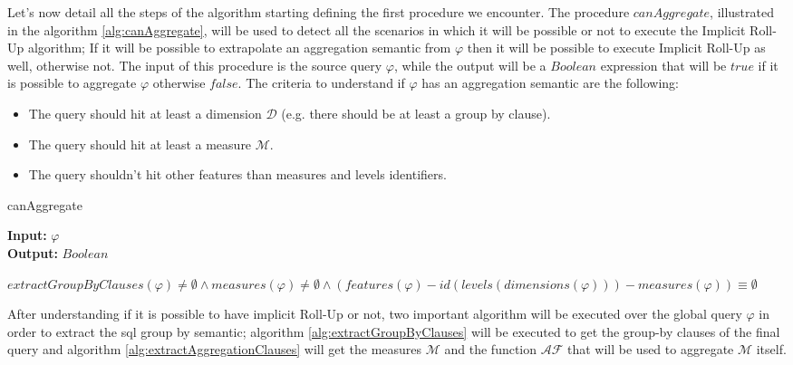 \documentclass[12pt,a4paper]{report}
\newcommand\globalQuery{\varphi}
\newcommand\dimension{\mathcal{D}}
\newcommand\measure{\mathcal{M}}
\newcommand\dimensions{dimensions}
\newcommand\aggregatingFunction{\mathcal{AF}}
\newcommand\id{id}
\newcommand\levels{levels}
\newcommand\measures{measures}
\newcommand\features{features}
\begin{document}
Let's now detail all the steps of the algorithm starting defining the first procedure we encounter.
%
The procedure $canAggregate$, illustrated in the  algorithm \ref{alg:canAggregate}, will be used to detect all the scenarios in which it will be possible or not to execute the Implicit Roll-Up algorithm; If it will be possible to extrapolate an aggregation semantic from $\globalQuery$ then it will be possible to execute Implicit Roll-Up as well, otherwise not.
%
The input of this procedure is the source query $\globalQuery$, while the output will be a $Boolean$ expression that will be $true$ if it is possible to aggregate $\globalQuery$ otherwise $false$.
%
The criteria to understand if $\globalQuery$ has an aggregation semantic are the following:
%
\begin{itemize}
    \item The query should hit at least a dimension $\dimension$ (e.g. there should be at least a group by clause).
    \item The query should hit at least a measure $\measure$.
    \item The query shouldn't hit other features than measures and levels identifiers.
\end{itemize}
%
\begin{algorithm}[ht]
\caption{canAggregate}\label{alg:canAggregate}
\textbf{Input:} $\globalQuery$\\
\textbf{Output:} $Boolean$
\begin{algorithmic}[1]
\State \Return $ extractGroupByClauses(\globalQuery) \neq \emptyset \land \measures(\globalQuery) \neq \emptyset \land (\features(\globalQuery) - \id(\levels(\dimensions(\globalQuery))) - \measures(\globalQuery)) \equiv \emptyset$
\end{algorithmic}
\end{algorithm}

After understanding if it is possible to have implicit Roll-Up or not, two important algorithm will be executed over the global query $\globalQuery$ in order to extract the sql group by semantic; algorithm \ref{alg:extractGroupByClauses} will be executed to get the group-by clauses of the final query and algorithm \ref{alg:extractAggregationClauses} will get the measures $\measure$ and the function $\aggregatingFunction$ that will be used to aggregate $\measure$ itself. 
\end{document}
